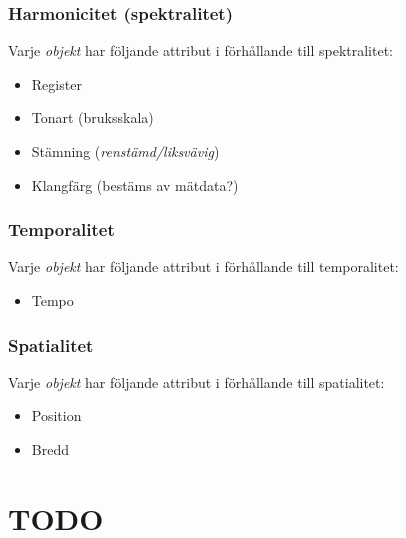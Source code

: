 \hypertarget{harmonicitet-spektralitet}{%
\subsubsection{Harmonicitet
(spektralitet)}\label{harmonicitet-spektralitet}}

Varje \emph{objekt} har följande attribut i förhållande till
spektralitet:

\begin{itemize}
\tightlist
\item
  Register
\item
  Tonart (bruksskala)
\item
  Stämning (\emph{renstämd/liksvävig})
\item
  Klangfärg (bestäms av mätdata?)
\end{itemize}

\hypertarget{temporalitet}{%
\subsubsection{Temporalitet}\label{temporalitet}}

Varje \emph{objekt} har följande attribut i förhållande till
temporalitet:

\begin{itemize}
\tightlist
\item
  Tempo
\end{itemize}

\hypertarget{spatialitet}{%
\subsubsection{Spatialitet}\label{spatialitet}}

Varje \emph{objekt} har följande attribut i förhållande till
spatialitet:

\begin{itemize}
\tightlist
\item
  Position
\item
  Bredd
\end{itemize}

\hypertarget{todo}{%
\section{TODO}\label{todo}}

